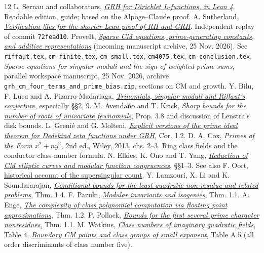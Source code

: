 \documentclass[11pt,letterpaper]{article}
\newcommand{\repo}[2]{\href{https://github.com/lsernau/grh-lean/blob/72fead102f663d5c7a407964a13dc0cf9d977207/grh/#1}{#2}}
\begin{document}
\small
\begin{thebibliography}{12}
\setlength{\itemsep}{.05em}\setlength{\parskip}{0pt}
 L. Sernau and collaborators, \href{https://github.com/lsernau/grh-lean/tree/72fead102f663d5c7a407964a13dc0cf9d977207}{\emph{GRH for Dirichlet L-functions, in Lean 4}}. Readable edition, \repo{GUIDE.md}{guide}; based on the Alp\"oge--Claude proof.
 A. Sutherland, \href{https://math.mit.edu/~drew/shortgrh/}{\emph{Verification files for the shorter Lean proof of RH and GRH}}. Independent replay of commit \texttt{72fead10}.
 ProveIt, \href{https://github.com/VladimirReshetnikov/ProveIt/blob/13c30b3b677b691845466289bfdb792d11fefad5/docs/incoming/grh_cm_prime_applications.zip}{\emph{Sparse CM equations, prime-generating constants, and additive representations}} (incoming manuscript archive, 25 Nov. 2026). See \texttt{riffaut.tex}, \texttt{cm-finite.tex}, \texttt{cm\_small.tex}, \texttt{cm4075.tex}, \texttt{cm-conclusion.tex}.
 \emph{Sparse equations for singular moduli and the sign of weighted prime sums}, parallel workspace manuscript, 25 Nov. 2026, archive \texttt{grh\_cm\_four\_terms\_and\_prime\_bias.zip}, sections on CM and growth.
 Y. Bilu, F. Luca and A. Pizarro-Madariaga, \href{https://arxiv.org/abs/2003.06547}{\emph{Trinomials, singular moduli and Riffaut's conjecture}}, especially \S\S2, 9.
 M. Avenda\~no and T. Krick, \href{https://arxiv.org/abs/1008.4808}{\emph{Sharp bounds for the number of roots of univariate fewnomials}}, Prop. 3.8 and discussion of Lenstra's disk bounds.
 L. Greni\'e and G. Molteni, \href{https://arxiv.org/abs/1312.4463}{\emph{Explicit versions of the prime ideal theorem for Dedekind zeta functions under GRH}}, Cor. 1.2.
 D. A. Cox, \emph{Primes of the Form $x^2+ny^2$}, 2nd ed., Wiley, 2013, chs. 2--3. Ring class fields and the conductor class-number formula.
 N. Elkies, K. Ono and T. Yang, \href{https://people.math.wisc.edu/~tonghaiyang/deuring.pdf}{\emph{Reduction of CM elliptic curves and modular function congruences}}, \S\S1--3. See also F. Oort, \href{https://webspace.science.uu.nl/~oort0109/EigArt-HistpRH-2016.pdf}{historical account of the supersingular count}.
 Y. Lamzouri, X. Li and K. Soundararajan, \href{https://arxiv.org/abs/1309.3595}{\emph{Conditional bounds for the least quadratic non-residue and related problems}}, Thm. 1.4.
 F. Pazuki, \href{https://arxiv.org/abs/1611.01094}{\emph{Modular invariants and isogenies}}, Thm. 1.1.
 A. Enge, \href{https://arxiv.org/abs/cs/0601104}{\emph{The complexity of class polynomial computation via floating point approximations}}, Thm. 1.2.
 P. Pollack, \href{https://arxiv.org/abs/1508.05035}{\emph{Bounds for the first several prime character nonresidues}}, Thm. 1.1.
 M. Watkins, \href{https://magma.maths.usyd.edu.au/~watkins/papers/smallcn.pdf}{\emph{Class numbers of imaginary quadratic fields}}, Table 4.
 \href{https://arxiv.org/html/2605.26020v1}{\emph{Boundary CM points and class groups of small exponent}}, Table A.5 (all order discriminants of class number five).
\end{thebibliography}
\end{document}
